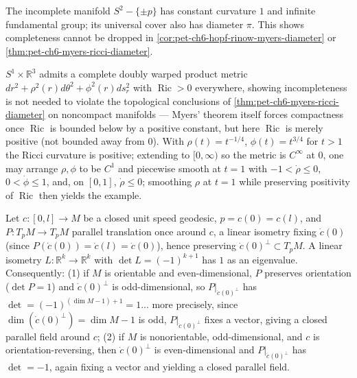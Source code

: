 \begin{example}
  \label{ex:pet-ch6-punctured-sphere-infinite-pi1}
  The incomplete manifold $S^2-\{\pm p\}$ has constant curvature $1$ and
  infinite fundamental group; its universal cover also has diameter $\pi$.
  This shows completeness cannot be dropped in
  \cref{cor:pet-ch6-hopf-rinow-myers-diameter} or
  \cref{thm:pet-ch6-myers-ricci-diameter}.
\end{example}

\begin{example}
  \label{ex:pet-ch6-doubly-warped-ricci-positive}
  $S^1\times\mathbb{R}^3$ admits a complete doubly warped product metric
  $dr^2+\rho^2(r)d\theta^2+\phi^2(r)ds_r^2$ with $\operatorname{Ric}>0$ everywhere,
  showing incompleteness is not needed to violate the topological conclusions
  of \cref{thm:pet-ch6-myers-ricci-diameter} on noncompact manifolds — Myers'
  theorem itself forces compactness once $\operatorname{Ric}$ is bounded below by a
  positive constant, but here $\operatorname{Ric}$ is merely positive (not bounded
  away from $0$). With $\rho(t)=t^{-1/4}$, $\phi(t)=t^{3/4}$ for $t>1$ the
  Ricci curvature is positive; extending to $[0,\infty)$ so the metric is
  $C^\infty$ at $0$, one may arrange $\rho,\phi$ to be $C^1$ and piecewise
  smooth at $t=1$ with $-1<\dot\rho\le0$, $0<\dot\phi\le1$, and, on $[0,1]$,
  $\dot\rho\le0$; smoothing $\rho$ at $t=1$ while preserving positivity of
  $\operatorname{Ric}$ then yields the example.
\end{example}

\begin{remark}
  \label{rem:pet-ch6-closed-parallel-field-construction}
  Let $c:[0,l]\to M$ be a closed unit speed geodesic, $p=c(0)=c(l)$, and
  $P:T_pM\to T_pM$ parallel translation once around $c$, a linear isometry
  fixing $\dot c(0)$ (since $P(\dot c(0))=\dot c(l)=\dot c(0)$), hence
  preserving $\dot c(0)^\perp\subset T_pM$. A linear isometry
  $L:\mathbb{R}^k\to\mathbb{R}^k$ with $\det L=(-1)^{k+1}$ has $1$ as an eigenvalue.
  Consequently: (1) if $M$ is orientable and even-dimensional, $P$ preserves
  orientation ($\det P=1$) and $\dot c(0)^\perp$ is odd-dimensional, so
  $P|_{\dot c(0)^\perp}$ has $\det=(-1)^{(\dim M-1)+1}=1$... more precisely,
  since $\dim(\dot c(0)^\perp)=\dim M-1$ is odd, $P|_{\dot c(0)^\perp}$ fixes
  a vector, giving a closed parallel field around $c$; (2) if $M$ is
  nonorientable, odd-dimensional, and $c$ is orientation-reversing, then
  $\dot c(0)^\perp$ is even-dimensional and $P|_{\dot c(0)^\perp}$ has
  $\det=-1$, again fixing a vector and yielding a closed parallel field.
\end{remark}

